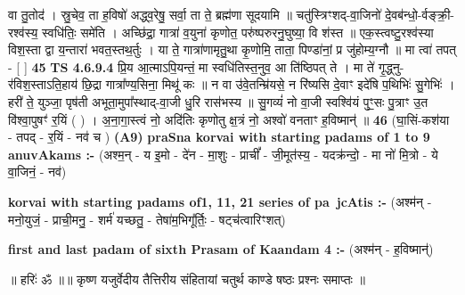 \documentclass[17pt]{extarticle}
\begin{document}
                  वा तु॒तोद॑ । स्रु॒चेव॒ ता ह॒विषो॑ अद्ध्व॒रेषु॒ सर्वा॒ ता ते॒ ब्रह्म॑णा सूदयामि ॥ चतु॑स्त्रिꣳशद्-वा॒जिनो॑ दे॒वब॑न्धो॒-र्वङ्क्री॒-रश्व॑स्य॒ स्वधि॑तिः॒ समे॑ति । अच्छि॑द्रा॒ गात्रा॑ व॒युना॑ कृणोत॒ परु॑ष्परुरनु॒घुष्या॒ वि श॑स्त ॥ एक॒स्त्वष्टु॒रश्व॑स्या विश॒स्ता द्वा य॒न्तारा॑ भवत॒स्तथ॒र्तुः । या ते॒ गात्रा॑णामृतु॒था कृ॒णोमि॒ ताता॒ पिण्डा॑नां॒ प्र जु॑होम्य॒ग्नौ ॥ मा त्वा॑ तपत् - [  ] \textbf{  45} \newline
                  \newline
                                \textbf{ TS 4.6.9.4} \newline
                  प्रि॒य आ॒त्माऽपि॒यन्तं॒ मा स्वधि॑तिस्त॒नुव॒ आ ति॑ष्ठिपत् ते । मा ते॑ गृ॒द्ध्नु-र॑विश॒स्ताऽति॒हाय॑ छि॒द्रा गात्रा᳚ण्य॒सिना॒ मिथू॑ कः ॥ न वा उ॑वे॒तन्म्रि॑यसे॒ न रि॑ष्यसि दे॒वाꣳ इदे॑षि प॒थिभिः॑ सु॒गेभिः॑ । हरी॑ ते॒ युञ्जा॒ पृष॑ती अभूता॒मुपा᳚स्थाद्-वा॒जी धु॒रि रास॑भस्य ॥ सु॒गव्यं॑ नो वा॒जी स्वश्वि॑यं पुꣳ॒॒सः पु॒त्राꣳ उ॒त वि॑श्वा॒पुषꣳ॑ र॒यिं ( ) । अ॒ना॒गा॒स्त्वं नो॒ अदि॑तिः कृणोतु क्ष॒त्रं नो॒ अश्वो॑ वनताꣳ ह॒विष्मान्॑ ॥ \textbf{  46 } \newline
                  \newline
                      (घा॒सिं-कश॑या - तपद् - र॒यिं - नव॑ च )  \textbf{(A9)} \newline \newline
                \textbf{praSna korvai with starting padams of 1 to 9 anuvAkams :-} \newline
        (अश्म॒न् - य इ॒मो - दे॑न - मा॒शुः - प्राचीं᳚ - जी॒मूत॑स्य॒ - यदक्र॑न्दो॒ - मा नो॑ मि॒त्रो - ये वा॒जिनं॒ - नव॑) \newline

        \textbf{korvai with starting padams of1, 11, 21 series of pa~jcAtis :-} \newline
        (अश्म॑न् - मनो॒युजं॒ - प्राची॒मनु॒ - शर्म॑ यच्छतु॒ - तेषा॑म॒भिगू᳚र्तिः॒ - षट्च॑त्वारिꣳशत्) \newline

        \textbf{first and last padam of sixth Prasam of Kaandam 4 :-} \newline
        (अश्म॑न् - ह॒विष्मान्॑) \newline 

        
        ॥ हरिः॑ ॐ ॥॥ कृष्ण यजुर्वेदीय तैत्तिरीय संहितायां चतुर्थ काण्डे षष्ठः प्रश्नः समाप्तः ॥ \newline
        \pagebreak
                \pagebreak
        
\end{document}
